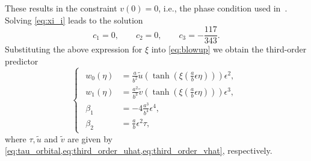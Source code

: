 These results in the constraint $v(0)=0$, i.e., the phase condition used
in~\cite{Kuznetsov2014improved}. Solving \cref{eq:xi_i} leads to the solution
\begin{equation}
    \label{eq:c_i_first_phase_condition}
     c_1=0, \qquad c_2=0, \qquad c_3=-\frac{117}{343}.
\end{equation}
Substituting the above expression for $\xi$ into \cref{eq:blowup} we obtain the
third-order predictor
\begin{equation}
\label{eq:third_order_predictor_LP_tau}
\begin{cases}
\begin{aligned}
w_0(\eta)  &= \frac{a}{b^2} 
\tilde {u}\left(\tanh\left(\xi\left(\frac{a}{b}\epsilon\eta\right)\right)\right) \epsilon^2, \\
w_1(\eta)  &= \frac{a^2}{b^3}
\tilde {v}\left(\tanh\left(\xi\left(\frac{a}{b}\epsilon\eta\right)\right)\right) \epsilon^3, \\
\beta_1    &= -4 \frac{a^3}{b^4}\epsilon^4, \\
\beta_2    &= \frac{a}{b}\epsilon^2\tau,
\end{aligned}
\end{cases}
\end{equation}
where $\tau,\tilde{u}$ and $\tilde{v}$ are given by
\cref{eq:tau_orbital,eq:third_order_uhat,eq:third_order_vhat}, respectively.


